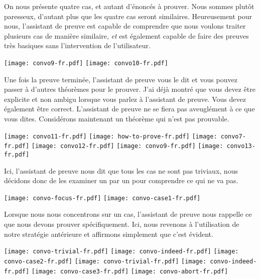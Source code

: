 On nous présente quatre cas, et autant d'énoncés à prouver.
Nous sommes plutôt paresseux, d'autant plus que les quatre cas seront
similaires. Heureusement pour nous, l'assistant de preuve est capable de
comprendre que nous voulons traiter plusieurs cas de manière similaire,
\emph{et} est également capable de faire des preuves très basiques sans
l'intervention de l'utilisateur.

\begin{center}
  \texttt{[image: convo9-fr.pdf]}
  \texttt{[image: convo10-fr.pdf]}
\end{center}

Une fois la preuve terminée, l'assistant de preuve vous le dit et vous pouvez
passer à d'autres théorèmes pour le prouver. J'ai déjà montré que vous devez
être explicite et non ambigu lorsque vous parlez à l'assistant de preuve. Vous
devez également être correct.
L'assistant de preuve ne se fiera pas aveuglément à ce que vous dites.
%
Considérons maintenant un théorème qui n'est pas prouvable.

\begin{center}
  \texttt{[image: convo11-fr.pdf]}
  \texttt{[image: how-to-prove-fr.pdf]}
  \texttt{[image: convo7-fr.pdf]}
  \texttt{[image: convo12-fr.pdf]}
  \texttt{[image: convo9-fr.pdf]}
  \texttt{[image: convo13-fr.pdf]}
\end{center}

Ici, l'assistant de preuve nous dit que tous les cas ne sont pas triviaux, nous
décidons donc de les examiner un par un pour comprendre ce qui ne va pas.

\begin{center}
  \texttt{[image: convo-focus-fr.pdf]}
  \texttt{[image: convo-case1-fr.pdf]}
\end{center}

Lorsque nous nous concentrons sur un cas, l'assistant de preuve nous rappelle ce
que nous devons prouver spécifiquement. Ici, nous revenons à l'utilisation de
notre stratégie antérieure et affirmons simplement que c'est évident.

\begin{center}
  \texttt{[image: convo-trivial-fr.pdf]}
  \texttt{[image: convo-indeed-fr.pdf]}
  \texttt{[image: convo-case2-fr.pdf]}
  \texttt{[image: convo-trivial-fr.pdf]}
  \texttt{[image: convo-indeed-fr.pdf]}
  \texttt{[image: convo-case3-fr.pdf]}
  \texttt{[image: convo-abort-fr.pdf]}
\end{center}


